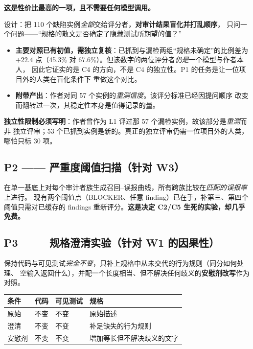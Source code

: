 \documentclass[11pt,a4paper]{article}
\begin{document}
\textbf{这是性价比最高的一项，且不需要任何模型调用。}

设计：把 110 个缺陷实例\emph{全部}交给评分者，\textbf{对审计结果盲化并打乱顺序}，
只问一个问题——“规格的散文是否确定了隐藏测试所期望的值？”

\begin{itemize}
\item \textbf{主要对照已有初值，需独立复核}：已抓到与漏检两组“规格未确定”的比例差为
      $+22.4$ 点（45.3\% 对 67.6\%）。但该数字的两位评分者\emph{仍是}一个模型与作者本人，
      因此它证实的是 C4 的方向，不是 C4 的独立性。P1 的任务是让一位项目外的人类在盲化条件下
      重做这个对比。
\item \textbf{附带产出}：作者对同 57 个实例的\emph{重测信度}。该评分标准已经因提问顺序
      改变而翻转过一次，其稳定性本身是值得记录的量。
\end{itemize}

\textbf{独立性限制必须写明}：作者曾作为 L1 评过那 57 个漏检实例，故该部分是\emph{重测}而非
独立评审；53 个已抓到实例是新的。真正的独立评审仍需一位项目外的人类，哪怕只标 30 项。

\subsection{P2 —— 严重度阈值扫描（针对 W3）}

在单一基底上对每个审计者族生成召回--误报曲线，所有跨族比较在\emph{匹配的误报率}上进行。
现有两个阈值点（BLOCKER、任意 finding）已在手，补第三、第四个阈值只需对已缓存的 findings
重新评分。\textbf{这是决定 C2/C5 生死的实验，却几乎免费。}

\subsection{P3 —— 规格澄清实验（针对 W1 的因果性）}

保持代码与可见测试\emph{完全不变}，只补上规格中从未交代的行为规则（同分如何处理、
空输入返回什么），并配一个长度相当、但不解决任何歧义的\textbf{安慰剂改写}作为对照。

\begin{center}
\begin{tabular}{@{}llll@{}}
\toprule
\textbf{条件} & \textbf{代码} & \textbf{可见测试} & \textbf{规格} \\
\midrule
原始 & 不变 & 不变 & 原始描述 \\
澄清 & 不变 & 不变 & 补足缺失的行为规则 \\
安慰剂 & 不变 & 不变 & 增加等长但不解决歧义的文字 \\
\bottomrule
\end{tabular}
\end{center}
\end{document}
